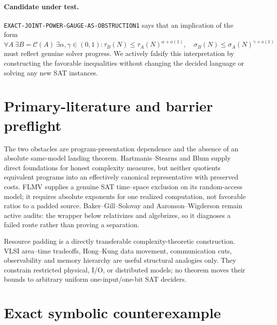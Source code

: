 \documentclass[11pt]{article}
\begin{document}
\paragraph{Candidate under test.}
\texttt{EXACT-JOINT-POWER-GAUGE-AS-OBSTRUCTION1} says that an implication of
the form
\[
 \forall A\ \exists B=\mathcal C(A)\ \exists\alpha,\gamma\in(0,1):
 \tau_B(N)\le\tau_A(N)^{\alpha+o(1)},\quad
 \sigma_B(N)\le\sigma_A(N)^{\gamma+o(1)}
\]
must reflect genuine solver progress.  We actively falsify this interpretation
by constructing the favorable inequalities without changing the decided
language or solving any new SAT instances.

\section{Primary-literature and barrier preflight}

The two obstacles are program-presentation dependence and the absence of an
absolute same-model landing theorem.  Hartmanis--Stearns and Blum supply direct
foundations for honest complexity measures, but neither quotients equivalent
programs into an effectively canonical representative with preserved costs.
FLMV supplies a genuine SAT time--space exclusion on its random-access model;
it requires absolute exponents for one realized computation, not favorable
ratios to a padded source.  Baker--Gill--Solovay and Aaronson--Wigderson remain
active audits: the wrapper below relativizes and algebrizes, so it diagnoses a
failed route rather than proving a separation.

Resource padding is a directly transferable complexity-theoretic construction.
VLSI area--time tradeoffs, Hong--Kung data movement, communication cuts,
observability and memory hierarchy are useful structural analogies only.  They
constrain restricted physical, I/O, or distributed models; no theorem moves
their bounds to arbitrary uniform one-input/one-bit SAT deciders.

\section{Exact symbolic counterexample}
\end{document}
